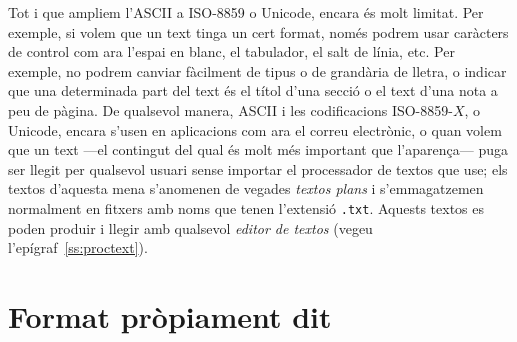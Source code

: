 Tot i que ampliem l'ASCII a ISO-8859 o Unicode, encara és molt
limitat.  Per exemple, si volem que un text tinga un cert format,
només podrem usar caràcters de control com ara l'espai en blanc, el
tabulador, el salt de línia, etc.  Per exemple, no podrem canviar
fàcilment de tipus o de grandària de lletra, o indicar que una
determinada part del text és el títol d'una secció o el text d'una
nota a peu de pàgina. De qualsevol manera, ASCII i les codificacions
ISO-8859-$X$, o Unicode, encara s'usen en aplicacions com ara el
correu electrònic, o quan volem que un text ---el contingut del qual
és molt més important que l'aparença--- puga ser llegit per qualsevol
usuari sense importar el processador de textos que use; els textos
d'aquesta mena s'anomenen de vegades \emph{textos plans} i
s'emmagatzemen normalment en fitxers amb noms que tenen l'extensió
\texttt{.txt}.  Aquests textos es poden produir i llegir amb qualsevol
\emph{editor de textos} (vegeu l'epígraf~\ref{ss:proctext}).


\section{Format pròpiament dit}

